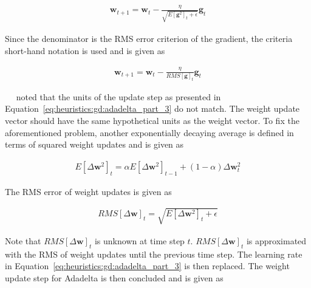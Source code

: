\begin{equation}
      \label{eq:heuristics:gd:adadelta_part_2}
      \begin{split}
            \boldsymbol{w}_{t+1} = \boldsymbol{w}_{t} - \frac{\eta}{\sqrt{E[\boldsymbol{g}^{2}]_{t} + \epsilon}} \boldsymbol{g}_{t}
      \end{split}
\end{equation}

Since the denominator is the \acf{RMS} error criterion of the gradient, the criteria short-hand notation is used and is given as

\begin{equation}
      \label{eq:heuristics:gd:adadelta_part_3}
      \begin{split}
            \boldsymbol{w}_{t+1} = \boldsymbol{w}_{t} - \frac{\eta}{RMS[\boldsymbol{g}]_{t}} \boldsymbol{g}_{t}
      \end{split}
\end{equation}

~\citeauthor{ref:zeiler:2012}~\cite{ref:zeiler:2012} noted that the units of the update step as presented in Equation~\eqref{eq:heuristics:gd:adadelta_part_3} do not match. The weight update vector should have the same hypothetical units as the weight vector. To fix the aforementioned problem, another exponentially decaying average is defined in terms of squared weight updates and is given as

\begin{equation}
      \label{eq:heuristics:gd:adadelta_part_4}
      \begin{split}
            E[\Delta \boldsymbol{w}^{2}]_{t} = \alpha E[\Delta \boldsymbol{w}^{2}]_{t - 1} + (1 - \alpha)\Delta \boldsymbol{w}_{t}^{2}
      \end{split}
\end{equation}

The \acf{RMS} error of weight updates is given as

\begin{equation}
      \label{eq:heuristics:gd:adadelta_part_5}
      \begin{split}
            RMS[\Delta \boldsymbol{w}]_{t} = \sqrt{E[\Delta \boldsymbol{w}^{2}]_{t} + \epsilon}
      \end{split}
\end{equation}

Note that $RMS[\Delta \boldsymbol{w}]_{t}$ is unknown at time step $t$. $RMS[\Delta \boldsymbol{w}]_{t}$ is approximated with the \acf{RMS} of weight updates until the previous time step. The learning rate in Equation~\eqref{eq:heuristics:gd:adadelta_part_3} is then replaced. The weight update step for \acs{Adadelta} is then concluded and is given as

